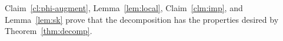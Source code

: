 \noindent
Claim~\ref{cl:phi-augment}, Lemma~\ref{lem:local}, Claim~\ref{clm:imp}, and Lemma~\ref{lem:sk} prove that the decomposition has the properties desired by 
Theorem~\ref{thm:decomp}. 

%
%
%
%
